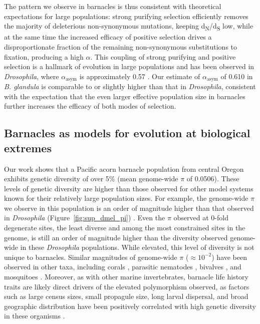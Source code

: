 \documentclass[11pt]{article}
\newcommand{\dnds}{d\textsubscript{N}/d\textsubscript{S}\xspace}
\newcommand{\bgla}{\textit{B. glandula}\xspace}
\begin{document}
The pattern we observe in barnacles is thus consistent with theoretical expectations
for large populations: strong purifying selection efficiently removes the majority
of deleterious non-synonymous mutations, keeping \dnds{} low, while at the same time
the increased efficacy of positive selection drives a disproportionate fraction of
the remaining non-synonymous substitutions to fixation, producing a high
$\alpha$. This coupling of strong purifying and positive selection is a hallmark
of evolution in large populations and has been observed in \textit{Drosophila}, where
$\alpha_\text{asym}$ is approximately 0.57 \citep{messer_frequent_2013}.
Our estimate of $\alpha_\text{asym}$ of 0.610 in \bgla{} is comparable to
or slightly higher than that in \textit{Drosophila}, consistent with the expectation
that the even larger effective population size in barnacles further increases the
efficacy of both modes of selection.

\subsection*{Barnacles as models for evolution at biological extremes}

Our work shows that a Pacific acorn barnacle population from central Oregon exhibits
genetic diversity of over 5\% (mean genome-wide $\pi$ of 0.0506).
These levels of genetic diversity are higher than those observed for other model
systems known for their relatively large population sizes.
For example, the genome-wide $\pi$ we observe in this population is an order of
magnitude higher than that observed in \textit{Drosophila} (Figure~\ref{fig:sup_dmel_pi})
\citep{nunez_footprints_2025,li_comparative_2025,pool_population_2012,
langley_genomic_2012}.
Even the $\pi$ observed at 0-fold degenerate sites, the least diverse and among the
most constrained sites in the genome, is still an order of magnitude higher than the
diversity observed genome-wide in these \textit{Drosophila} populations.
While elevated, this level of diversity is not unique to barnacles.
Similar magnitudes of genome-wide $\pi$ ($\approx10^{-2}$) have been observed
in other taxa, including corals \citep{meziere_corals_2025}, parasitic nematodes
\citep{stevens_nematodes_2023}, bivalves \citep{liu_bivalves_2025}, and mosquitoes
\citep{kent_aedes_2025,small_funestus_2023}.
Moreover, as with other marine invertebrates, barnacle life history traits are likely
direct drivers of the elevated polymorphism observed, as factors such as large census
sizes, small propagule size, long larval dispersal, and broad geographic distribution
have been positively correlated with high genetic diversity in these
organisms \citep{leffler_revisiting_2012,romiguier_comparative_2014}.
\vspace{0.2cm}
\end{document}
